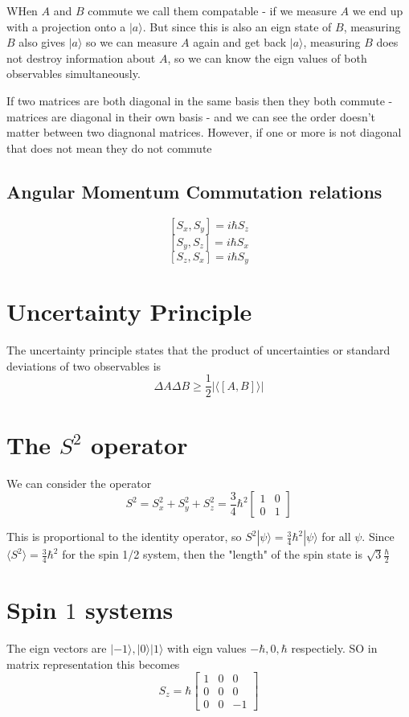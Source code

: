 \documentclass{homework}
\newcommand{\m}[1]{\begin{bmatrix} #1 \end{bmatrix}}
\newcommand{\kt}{\rangle}
\newcommand{\br}{\langle}
\newcommand{\ket}[1]{| #1 \rangle}
\begin{document}
WHen $A$ and $B$ commute we call them compatable - if we measure $A$ we end up with a projection onto a $| a \kt$. But since this is also an eign state of $B$, measuring $B$ also gives $| a \kt$ so we can measure $A$ again and get back $| a \kt$, measuring $B$ does not destroy information about $A$, so we can know the eign values of both observables simultaneously.

If two matrices are both diagonal in the same basis then they both commute - matrices are diagonal in their own basis - and we can see the order doesn't matter between two diagnonal matrices. However, if one or more is not diagonal that does not mean they do not commute


\subsection{Angular Momentum Commutation relations}
\[[S_x,S_y] = i \hbar S_z\]
\[[S_y,S_z] = i \hbar S_x\]
\[[S_z,S_x] = i \hbar S_y\]



\section{Uncertainty Principle}

The uncertainty principle states that the product of uncertainties or standard deviations of two observables is 
\[\Delta A \Delta B \ge \frac{1}{2}|\br [A,B] \kt|\]


\section{The $S^2$ operator}

We can consider the operator 
\[S^2 = S_x^2 + S_y^2 + S_z^2 = \frac{3}{4}\hbar^2\m{1 & 0 \\ 0 & 1}\]

This is proportional to the identity operator, so $S^2 \ket{\psi} = \frac{3}{4}\hbar^2\ket{\psi}$ for all $\psi$. Since $\langle S^2 \rangle = \frac{3}{4}\hbar^2$ for the spin 1/2 system, then the "length" of the spin state is $\sqrt{3}\frac{\hbar}{2}$

\section{Spin $1$ systems}

The eign vectors are $\ket{-1}, \ket{0} \ket{1}$ with eign values $-\hbar, 0, \hbar$ respectiely. SO in matrix representation this becomes
\[S_z = \hbar \m{1 & 0 & 0 \\ 0 & 0 & 0 \\ 0 & 0 & -1}\]
\end{document}
